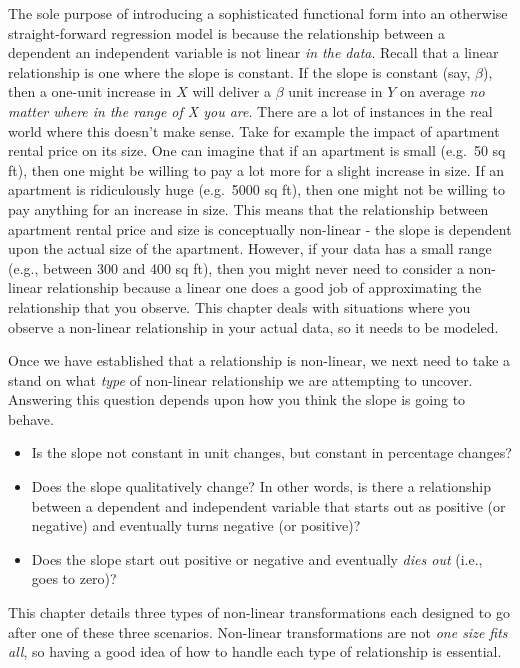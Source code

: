 \documentclass[
]{book}
\begin{document}
The sole purpose of introducing a sophisticated functional form into an otherwise straight-forward regression model is because the relationship between a dependent an independent variable is not linear \emph{in the data}. Recall that a linear relationship is one where the slope is constant. If the slope is constant (say, \(\beta\)), then a one-unit increase in \(X\) will deliver a \(\beta\) unit increase in \(Y\) on average \emph{no matter where in the range of X you are}. There are a lot of instances in the real world where this doesn't make sense. Take for example the impact of apartment rental price on its size. One can imagine that if an apartment is small (e.g.~50 sq ft), then one might be willing to pay a lot more for a slight increase in size. If an apartment is ridiculously huge (e.g.~5000 sq ft), then one might not be willing to pay anything for an increase in size. This means that the relationship between apartment rental price and size is conceptually non-linear - the slope is dependent upon the actual size of the apartment. However, if your data has a small range (e.g., between 300 and 400 sq ft), then you might never need to consider a non-linear relationship because a linear one does a good job of approximating the relationship that you observe. This chapter deals with situations where you observe a non-linear relationship in your actual data, so it needs to be modeled.

Once we have established that a relationship is non-linear, we next need to take a stand on what \emph{type} of non-linear relationship we are attempting to uncover. Answering this question depends upon how you think the slope is going to behave.

\begin{itemize}
\item
  Is the slope not constant in unit changes, but constant in percentage changes?
\item
  Does the slope qualitatively change? In other words, is there a relationship between a dependent and independent variable that starts out as positive (or negative) and eventually turns negative (or positive)?
\item
  Does the slope start out positive or negative and eventually \emph{dies out} (i.e., goes to zero)?
\end{itemize}

This chapter details three types of non-linear transformations each designed to go after one of these three scenarios. Non-linear transformations are not \emph{one size fits all}, so having a good idea of how to handle each type of relationship is essential.
\end{document}
